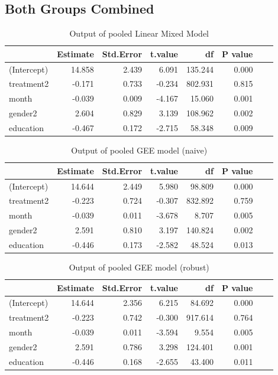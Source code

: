 \subsection{Both Groups Combined}

\begin{table}[H]
\centering
\begin{tabular}{|l|r|r|r|r|r|r|r|}
\hline
  & Estimate & Std.Error & t.value & df & P value\\
\hline
(Intercept) & 14.858 & 2.439 & 6.091 & 135.244 & 0.000 \\
\hline
treatment2 & -0.171 & 0.733 & -0.234 & 802.931 & 0.815 \\
\hline
month & -0.039 & 0.009 & -4.167 & 15.060 & 0.001 \\
\hline
gender2 & 2.604 & 0.829 & 3.139 & 108.962 & 0.002 \\
\hline
education & -0.467 & 0.172 & -2.715 & 58.348 & 0.009 \\
\hline
\end{tabular}
\caption{Output of pooled Linear Mixed Model}
\label{tab:lme.mi}
\end{table}

\begin{table}[H]
\centering
\begin{tabular}{|l|r|r|r|r|r|r|r|}
\hline
  & Estimate & Std.Error & t.value & df & P value\\
\hline
(Intercept) & 14.644 & 2.449 & 5.980 & 98.809 & 0.000 \\
\hline
treatment2 & -0.223 & 0.724 & -0.307 & 832.892 & 0.759 \\
\hline
month & -0.039 & 0.011 & -3.678 & 8.707 & 0.005 \\
\hline
gender2 & 2.591 & 0.810 & 3.197 & 140.824 & 0.002 \\
\hline
education & -0.446 & 0.173 & -2.582 & 48.524 & 0.013 \\
\hline
\end{tabular}
\caption{Output of pooled GEE model (naive)}
\label{tab:gee.mi.naive}
\end{table}

\begin{table}[H]
\centering
\begin{tabular}{|l|r|r|r|r|r|r|r|}
\hline
  & Estimate & Std.Error & t.value & df & P value\\
\hline
(Intercept) & 14.644 & 2.356 & 6.215 & 84.692 & 0.000 \\
\hline
treatment2 & -0.223 & 0.742 & -0.300 & 917.614 & 0.764 \\
\hline
month & -0.039 & 0.011 & -3.594 & 9.554 & 0.005 \\
\hline
gender2 & 2.591 & 0.786 & 3.298 & 124.401 & 0.001 \\
\hline
education & -0.446 & 0.168 & -2.655 & 43.400 & 0.011 \\
\hline
\end{tabular}
\caption{Output of pooled GEE model (robust)}
\label{tab:gee.mi.robust}
\end{table}